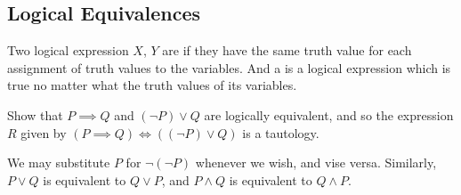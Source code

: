 \subsection{Logical Equivalences}

\begin{defn}
Two logical expression $X$, $Y$ are 
if they have the same truth value for each assignment of truth values to the variables.
And a  is a logical expression which is true no matter what the truth values of its variables.
\end{defn}


\begin{eg}
Show that $P\implies Q$ and $(\neg P)\vee Q$ are logically equivalent,
and so the expression $R$ given by $(P\implies Q)\iff((\neg P)\vee Q)$ is a tautology.
\end{eg}


We may substitute $P$ for $\neg(\neg P)$ whenever we wish, and vise versa.
Similarly, $P\vee Q$ is equivalent to $Q\vee P$, and $P\wedge Q$ is equivalent to $Q\wedge P$.

